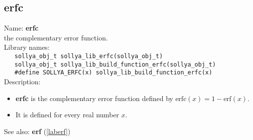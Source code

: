 \subsection{erfc}
\label{laberfc}
\noindent Name: \textbf{erfc}\\
\phantom{aaa}the complementary error function.\\[0.2cm]
\noindent Library names:\\
\verb|   sollya_obj_t sollya_lib_erfc(sollya_obj_t)|\\
\verb|   sollya_obj_t sollya_lib_build_function_erfc(sollya_obj_t)|\\
\verb|   #define SOLLYA_ERFC(x) sollya_lib_build_function_erfc(x)|\\[0.2cm]
\noindent Description: \begin{itemize}

\item \textbf{erfc} is the complementary error function defined by $\mathrm{erfc}(x) = 1 - \mathrm{erf}(x)$.

\item It is defined for every real number $x$.
\end{itemize}
See also: \textbf{erf} (\ref{laberf})
